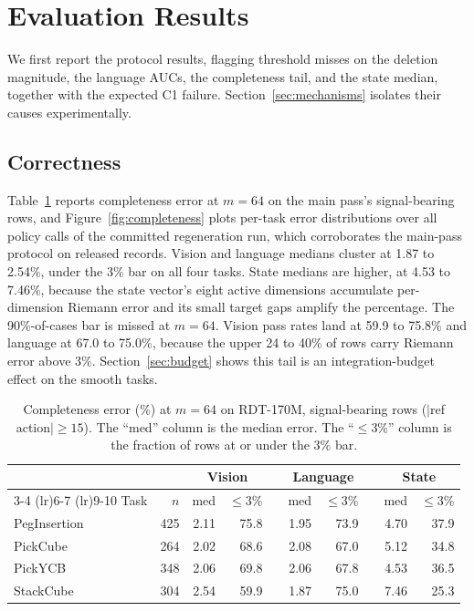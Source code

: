 \documentclass{article}
\begin{document}
\section{Evaluation Results}

We first report the protocol results, flagging threshold misses on the deletion magnitude, the language AUCs, the completeness tail, and the state median, together with the expected C1 failure.
Section~\ref{sec:mechanisms} isolates their causes experimentally.

\subsection{Correctness}

Table~\ref{tab:correctness} reports completeness error at $m{=}64$ on the main pass's signal-bearing rows, and Figure~\ref{fig:completeness} plots per-task error distributions over all policy calls of the committed regeneration run, which corroborates the main-pass protocol on released records.
Vision and language medians cluster at 1.87 to 2.54\%, under the 3\% bar on all four tasks.
State medians are higher, at 4.53 to 7.46\%, because the state vector's eight active dimensions accumulate per-dimension Riemann error and its small target gaps amplify the percentage.
The 90\%-of-cases bar is missed at $m{=}64$.
Vision pass rates land at 59.9 to 75.8\% and language at 67.0 to 75.0\%, because the upper 24 to 40\% of rows carry Riemann error above 3\%.
Section~\ref{sec:budget} shows this tail is an integration-budget effect on the smooth tasks.

\begin{table}[t]
\centering
\footnotesize
\setlength{\tabcolsep}{3.5pt}
\begin{tabular}{@{}l r rr r rr r rr@{}}
\toprule
 & & \multicolumn{2}{c}{\textbf{Vision}} & & \multicolumn{2}{c}{\textbf{Language}} & & \multicolumn{2}{c}{\textbf{State}} \\
\cmidrule(lr){3-4} \cmidrule(lr){6-7} \cmidrule(lr){9-10}
Task & $n$ & med & $\leq$3\% && med & $\leq$3\% && med & $\leq$3\% \\
\midrule
PegInsertion & 425 & 2.11 & 75.8 && 1.95 & 73.9 && 4.70 & 37.9 \\
\rowcolor{gray!6}
PickCube & 264 & 2.02 & 68.6 && 2.08 & 67.0 && 5.12 & 34.8 \\
PickYCB & 348 & 2.06 & 69.8 && 2.06 & 67.8 && 4.53 & 36.5 \\
\rowcolor{gray!6}
StackCube & 304 & 2.54 & 59.9 && 1.87 & 75.0 && 7.46 & 25.3 \\
\bottomrule
\end{tabular}
\caption{Completeness error (\%) at $m{=}64$ on RDT-170M, signal-bearing rows ($|$ref action$| \geq 15$). The ``med'' column is the median error. The ``$\leq$3\%'' column is the fraction of rows at or under the 3\% bar.}
\label{tab:correctness}
\end{table}
\end{document}
